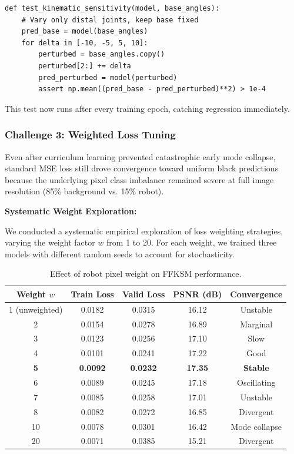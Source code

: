 \documentclass[12pt,a4paper,oneside]{report}
\begin{document}
{\footnotesize
\begin{verbatim}
def test_kinematic_sensitivity(model, base_angles):
    # Vary only distal joints, keep base fixed
    pred_base = model(base_angles)
    for delta in [-10, -5, 5, 10]:
        perturbed = base_angles.copy()
        perturbed[2:] += delta
        pred_perturbed = model(perturbed)
        assert np.mean((pred_base - pred_perturbed)**2) > 1e-4
\end{verbatim}
}

This test now runs after every training epoch, catching regression immediately.

\subsubsection{Challenge 3: Weighted Loss Tuning}
\label{subsubsec:challenge_3_weighted_loss_tuning}

Even after curriculum learning prevented catastrophic early mode collapse, standard MSE loss still drove convergence toward uniform black predictions because the underlying pixel class imbalance remained severe at full image resolution (85\% background vs. 15\% robot).

\textbf{Systematic Weight Exploration:}

We conducted a systematic empirical exploration of loss weighting strategies, varying the weight factor $w$ from 1 to 20. For each weight, we trained three models with different random seeds to account for stochasticity.

\begin{table}[H]
\centering
\caption{Effect of robot pixel weight on FFKSM performance.}
\label{tab:weight_tuning}
\begin{tabular}{ccccc}
\toprule
Weight $w$ & Train Loss & Valid Loss & PSNR (dB) & Convergence \\
\midrule
1 (unweighted) & 0.0182 & 0.0315 & 16.12 & Unstable \\
2 & 0.0154 & 0.0278 & 16.89 & Marginal \\
3 & 0.0123 & 0.0256 & 17.10 & Slow \\
4 & 0.0101 & 0.0241 & 17.22 & Good \\
\textbf{5} & \textbf{0.0092} & \textbf{0.0232} & \textbf{17.35} & \textbf{Stable} \\
6 & 0.0089 & 0.0245 & 17.18 & Oscillating \\
7 & 0.0085 & 0.0258 & 17.01 & Unstable \\
8 & 0.0082 & 0.0272 & 16.85 & Divergent \\
10 & 0.0078 & 0.0301 & 16.42 & Mode collapse \\
20 & 0.0071 & 0.0385 & 15.21 & Divergent \\
\bottomrule
\end{tabular}
\end{table}
\end{document}

